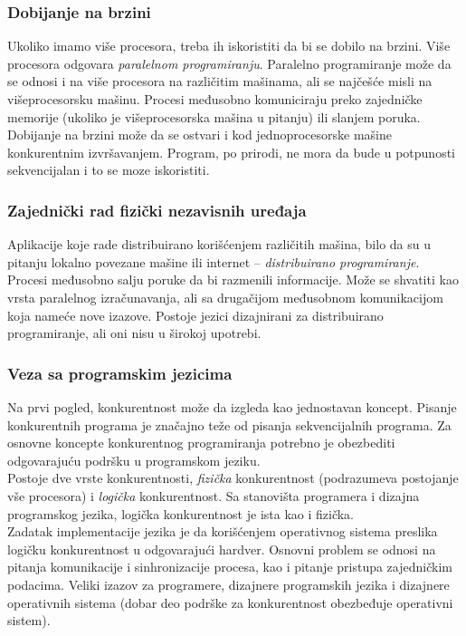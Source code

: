 \documentclass[../main.tex]{subfiles}
\begin{document}
\subsubsection{Dobijanje na brzini}						%
Ukoliko imamo više procesora, treba ih iskoristiti da bi se dobilo na brzini. Više procesora odgovara {\it paralelnom programiranju}. Paralelno programiranje može da se odnosi i na više procesora na različitim mašinama, ali se najčešće misli na višeprocesorsku mašinu. Procesi međusobno komuniciraju preko zajedničke memorije (ukoliko je višeprocesorska mašina u pitanju) ili slanjem poruka.
\\
Dobijanje na brzini može da se ostvari i kod jednoprocesorske mašine konkurentnim izvršavanjem. Program, po prirodi, ne mora da bude u potpunosti sekvencijalan i to se moze iskoristiti.

\subsubsection{Zajednički rad fizički nezavisnih uređaja}		%
Aplikacije koje rade distribuirano korišćenjem različitih mašina, bilo da su u pitanju lokalno povezane mašine ili internet -- {\it distribuirano programiranje}. Procesi međusobno salju poruke da bi razmenili informacije. Može se shvatiti kao vrsta paralelnog izračunavanja, ali sa drugačijom međusobnom komunikacijom koja nameće nove izazove. Postoje jezici dizajnirani za distribuirano programiranje, ali oni nisu u širokoj upotrebi.

\subsubsection{Veza sa programskim jezicima}		%
Na prvi pogled, konkurentnost može da izgleda kao jednostavan koncept. Pisanje konkurentnih programa je značajno teže od pisanja sekvencijalnih programa. Za osnovne koncepte konkurentnog programiranja potrebno je obezbediti odgovarajuću podršku u programskom jeziku.
\\
Postoje dve vrste konkurentnosti, {\it fizička} konkurentnost (podrazumeva postojanje vše procesora) i {\it logička} konkurentnost. Sa stanovišta programera i dizajna programskog jezika, logička konkurentnost je ista kao i fizička.
\\
\indent Zadatak implementacije jezika je da korišćenjem operativnog sistema preslika logičku konkurentnost u odgovarajući hardver.
Osnovni problem se odnosi na pitanja komunikacije i sinhronizacije procesa, kao i pitanje pristupa zajedničkim podacima. Veliki izazov za programere, dizajnere programskih jezika i dizajnere operativnih sistema (dobar deo podrške za konkurentnost obezbeđuje operativni sistem).
\end{document}
